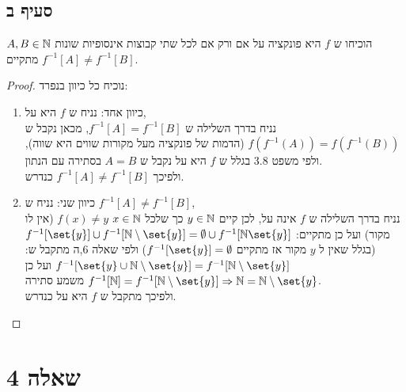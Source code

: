 \documentclass{article}
\DeclarePairedDelimiter\set\{\}
\begin{document}
\subsection*{סעיף ב}
הוכיחו ש $f$ היא פונקציה על אם ורק אם לכל שתי קבוצות אינסופיות שונות $A,B \in \mathbb{N}$ מתקיים $f^{-1}[A] \neq f^{-1}[B]$.
\begin{proof}
	נוכיח כל כיוון בנפרד:
	\begin{enumerate}
		\item כיוון אחד: נניח ש $f$ היא על, \\
		נניח בדרך השלילה ש $f^{-1}[A] = f^{-1}[B]$, מכאן נקבל ש
		$f(f^{-1}(A)) = f(f^{-1}(B))$ (הדמות של פונקציה מעל מקורות שווים היא שווה),
		ולפי משפט 3.8 בגלל ש $f$ היא על נקבל ש $A=B$ בסתירה עם הנתון. \\
		ולפיכך $f^{-1}[A] \neq f^{-1}[B]$ כנדרש.

		\item כיוון שני: נניח ש $f^{-1}[A] \neq f^{-1}[B]$, \\
		נניח בדרך השלילה ש $f$ אינה על,
		לכן קיים $y \in \mathbb{N}$ כך שלכל $x \in \mathbb{N}$ $f(x) \neq y$ (אין לו מקור)
		ועל כן מתקיים: $f^{-1}[\set{y}] \cup f^{-1}[\NN \sub \set{y}] = \emptyset \cup f^{-1}[\NN \set{y}]$
		(בגלל שאין ל $y$ מקור אז מתקיים $f^{-1}[\set{y}]=\emptyset$)
		ולפי שאלה 6,ה מתקבל ש: $f^{-1}[\set{y} \cup \NN \sub \set{y}] = f^{-1}[\NN \sub \set{y}]$
		ועל כן $f^{-1}[\NN] = f^{-1}[\NN \sub \set{y}] \Rightarrow \NN = \NN \sub \set{y}$
		משמע סתירה. \\
		ולפיכך מתקבל ש $f$ היא על כנדרש.
	\end{enumerate}
\end{proof}


\pagebreak
\section*{שאלה 4}
\end{document}
